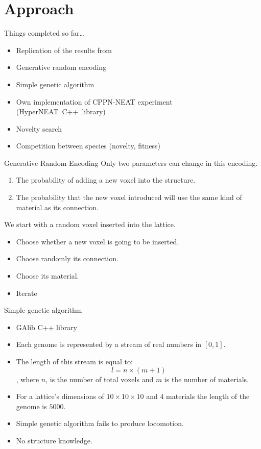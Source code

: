 \documentclass{beamer}
\begin{document}
\section{Approach}

\begin{frame}{Things completed so far\ldots}
\begin{itemize}
\item Replication of the results from~\cite{cheney2013unshackling}
\item Generative random encoding
\item Simple genetic algorithm
\item Own implementation of CPPN-NEAT experiment (HyperNEAT~C++~library)
\item Novelty search
\item Competition between species (novelty, fitness)
\end{itemize}
\end{frame}




\begin{frame}{Generative Random Encoding}
Only two parameters can change in this encoding.
\begin{enumerate}
\item The probability of adding a new voxel into the structure.
\item The probability that the new voxel introduced will use the same kind of material as its connection.
\end{enumerate}
We start with a random voxel inserted into the lattice.
\begin{itemize}
\item Choose whether a new voxel is going to be inserted.
\item Choose randomly its connection.
\item Choose its material.
\item Iterate
\end{itemize}
\end{frame}

\begin{frame}{Simple genetic algorithm}
\begin{itemize}
\item GAlib C++ library
\item Each genome is represented by a stream of real numbers in $[ 0,1 ]$.
\item The length of this stream is equal to:
\begin{equation*}
l = n \times (m + 1)
\end{equation*}
, where $n$, is the number of total voxels and $m$ is the number of materials.
\item For a lattice's dimensions of $10 \times 10 \times 10$ and $4$ materials the length of the genome is $5000$.
\item Simple genetic algorithm fails to produce locomotion.
\item No structure knowledge.
\end{itemize}
\end{frame}
\end{document}
